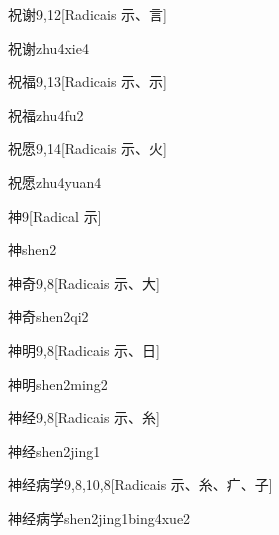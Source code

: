 \begin{entry}{祝谢}{9,12}[Radicais ⽰、⾔]
  \begin{phonetics}{祝谢}{zhu4xie4}
  \end{phonetics}
\end{entry}

\begin{entry}{祝福}{9,13}[Radicais ⽰、⽰]
  \begin{phonetics}{祝福}{zhu4fu2}
  \end{phonetics}
\end{entry}

\begin{entry}{祝愿}{9,14}[Radicais ⽰、⽕]
  \begin{phonetics}{祝愿}{zhu4yuan4}
  \end{phonetics}
\end{entry}

\begin{entry}{神}{9}[Radical ⽰]
  \begin{phonetics}{神}{shen2}
  \end{phonetics}
\end{entry}

\begin{entry}{神奇}{9,8}[Radicais ⽰、⼤]
  \begin{phonetics}{神奇}{shen2qi2}
  \end{phonetics}
\end{entry}

\begin{entry}{神明}{9,8}[Radicais ⽰、⽇]
  \begin{phonetics}{神明}{shen2ming2}
  \end{phonetics}
\end{entry}

\begin{entry}{神经}{9,8}[Radicais ⽰、⽷]
  \begin{phonetics}{神经}{shen2jing1}
  \end{phonetics}
\end{entry}

\begin{entry}{神经病学}{9,8,10,8}[Radicais ⽰、⽷、⽧、⼦]
  \begin{phonetics}{神经病学}{shen2jing1bing4xue2}
  \end{phonetics}
\end{entry}

